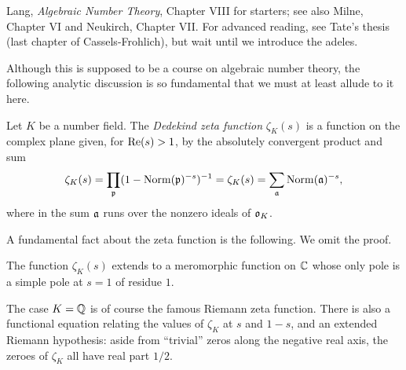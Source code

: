 %
%
%
%
%
%
%

 Lang, \textit{Algebraic Number Theory}, Chapter VIII for starters; see also Milne, Chapter VI and
Neukirch, Chapter VII. For advanced reading, see
Tate's thesis (last chapter of Cassels-Frohlich), but wait until
we introduce the adeles.

\medskip
Although this is supposed to be a course on algebraic number theory, the
following analytic discussion is so fundamental that we must at least allude
to it here.

Let $K$ be a number field. The \emph{Dedekind zeta function} $\zeta_K(s)$
is a function on the complex plane given, for $\operatorname{Re}(s) > 1$,
by the absolutely convergent product and sum
\[
\zeta_K(s) = \prod_{\mathfrak{p}} (1 - \operatorname{Norm}(\mathfrak{p})^{-s})^{-1}
=
\zeta_K(s) = \sum_{\mathfrak{a}} \operatorname{Norm}(\mathfrak{a})^{-s},
\]
where in the sum $\mathfrak{a}$ runs over the nonzero ideals of $\mathfrak{o}_K$.

A fundamental fact about the zeta function is the following. We omit the proof.
\begin{theorem} \label{T:meromorphic continuation}
The function $\zeta_K(s)$ extends to a meromorphic function on $\mathbb{C}$
whose only pole
is a simple pole at $s=1$ of residue $1$.
\end{theorem}
The case $K=\mathbb{Q}$ is of course the famous Riemann zeta function.
There is also a functional equation relating the values of $\zeta_K$ at
$s$ and $1-s$, and an extended Riemann hypothesis: aside from ``trivial''
zeros along the negative real axis, the zeroes of $\zeta_K$ all have
real part $1/2$.

